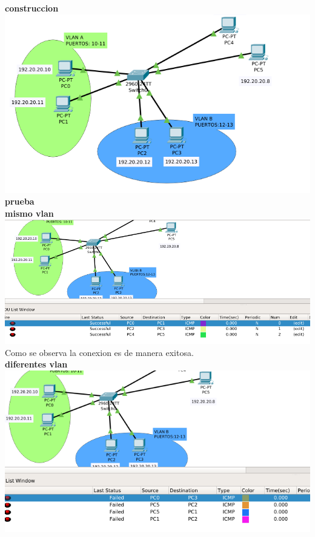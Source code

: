 \textbf{construccion}\\
\includegraphics[scale=0.5]{img/ejerc1.png} \\
\textbf{prueba}\\
\textbf{mismo vlan}\\
\includegraphics[scale=0.5]{img/succes1.png} 
\\Como se observa la conexion es de manera exitosa.\\
\textbf{diferentes vlan}\\
\includegraphics[scale=0.5]{img/failed1.png} \\

